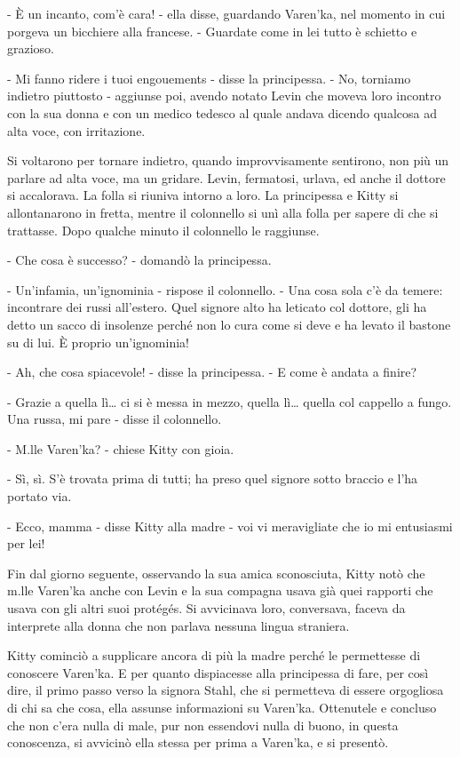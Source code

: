- È un incanto, com'è cara! - ella disse, guardando Varen'ka, nel momento in cui porgeva un bicchiere alla francese. - Guardate come in lei tutto è schietto e grazioso. 

- Mi fanno ridere i tuoi engouements - disse la principessa. - No, torniamo indietro piuttosto - aggiunse poi, avendo notato Levin che moveva loro incontro con la sua donna e con un medico tedesco al quale andava dicendo qualcosa ad alta voce, con irritazione. 

Si voltarono per tornare indietro, quando improvvisamente sentirono, non più un parlare ad alta voce, ma un gridare. Levin, fermatosi, urlava, ed anche il dottore si accalorava. La folla si riuniva intorno a loro. La principessa e Kitty si allontanarono in fretta, mentre il colonnello si unì alla folla per sapere di che si trattasse. Dopo qualche minuto il colonnello le raggiunse. 

- Che cosa è successo? - domandò la principessa. 

- Un'infamia, un'ignominia - rispose il colonnello. - Una cosa sola c'è da temere: incontrare dei russi all'estero. Quel signore alto ha leticato col dottore, gli ha detto un sacco di insolenze perché non lo cura come si deve e ha levato il bastone su di lui. È proprio un'ignominia! 

- Ah, che cosa spiacevole! - disse la principessa. - E come è andata a finire? 

- Grazie a quella lì\ldots{} ci si è messa in mezzo, quella lì\ldots{} quella col cappello a fungo. Una russa, mi pare - disse il colonnello. 

- M.lle Varen'ka? - chiese Kitty con gioia. 

- Sì, sì. S'è trovata prima di tutti; ha preso quel signore sotto braccio e l'ha portato via. 

- Ecco, mamma - disse Kitty alla madre - voi vi meravigliate che io mi entusiasmi per lei! 

Fin dal giorno seguente, osservando la sua amica sconosciuta, Kitty notò che m.lle Varen'ka anche con Levin e la sua compagna usava già quei rapporti che usava con gli altri suoi protégés. Si avvicinava loro, conversava, faceva da interprete alla donna che non parlava nessuna lingua straniera. 

Kitty cominciò a supplicare ancora di più la madre perché le permettesse di conoscere Varen'ka. E per quanto dispiacesse alla principessa di fare, per così dire, il primo passo verso la signora Stahl, che si permetteva di essere orgogliosa di chi sa che cosa, ella assunse informazioni su Varen'ka. Ottenutele e concluso che non c'era nulla di male, pur non essendovi nulla di buono, in questa conoscenza, si avvicinò ella stessa per prima a Varen'ka, e si presentò. 

